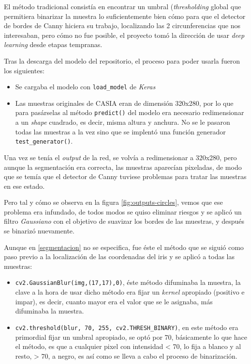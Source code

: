 El método tradicional consistía en encontrar un umbral (\emph{thresholding} global que permitiera binarizar la muestra lo suficientemente bien cómo para que el detector de bordes de Canny hiciera su trabajo, localizando las 2 circunferencias que nos interesaban, pero cómo no fue posible, el proyecto tomó la dirección de usar \emph{deep learning} desde etapas tempranas.

Tras la descarga del modelo del repositorio, el proceso para poder usarla fueron los siguientes:
\begin{itemize}
    \item Se cargaba el modelo con \texttt{load\_model} de \emph{Keras}
    \item Las muestras originales de CASIA eran de dimensión 320x280, por lo que para pasárselas al método \texttt{predict()} del modelo era necesario redimensionar a un \emph{shape} cuadrado, es decir, misma altura y anchura.
    No se le pasaron todas las muestras a la vez sino que se implentó una función generador \texttt{test\_generator()}.
\end{itemize}

Una vez se tenía el \emph{output} de la red, se volvía a redimensionar a 320x280, pero aunque la segmentación era correcta, las muestras aparecían pixeladas, de modo que se temía que el detector de Canny tuviese problemas para tratar las muestras en ese estado.

Pero tal y cómo se observa en la figura \ref{fig:outputs-circles}, vemos que ese problema era infundado, de todos modos se quiso eliminar riesgos y se aplicó un filtro \emph{Gaussiano} con el objetivo de suavizar los bordes de las muestras, y después se binarizó nuevamente.

Aunque en \ref{segmentacion} no se especifica, fue éste el método que se siguió como paso previo a la localización de las coordenadas del iris y se aplicó a todas las muestras:
\begin{itemize}
    \item \texttt{cv2.GaussianBlur(img,(17,17),0)}, éste método difuminaba la muestra, la clave a la hora de usar dicho método era fijar un \emph{kernel} apropiado (positivo e impar), es decir, cuanto mayor era el valor que se le asignaba, más difuminaba la muestra.
    \item \texttt{cv2.threshold(blur, 70, 255, cv2.THRESH\_BINARY)}, en este método era primordial fijar un umbral apropiado, se optó por 70, básicamente lo que hace el método, es que a cualquier pixel con intensidad < 70, lo fija a blanco y al resto, > 70, a negro, es así como se lleva a cabo el proceso de binarización.
\end{itemize}

